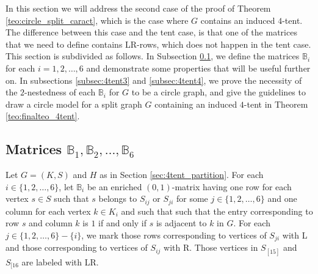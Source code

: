 \documentclass[12pt]{book}
\theoremstyle{plain}
\theoremstyle{remark}
\begin{document}
In this section we will address the second case of the proof of Theorem \ref{teo:circle_split_caract}, which is the case where $G$ contains an induced $4$-tent. The difference between this case and the tent case, is that one of the matrices that we need to define contains LR-rows, which does not happen in the tent case.
This section is subdivided as follows. %
In Subsection \ref{subsec:4tent2}, we define the matrices $\mathbb{B}_i$ for each $i=1, 2, \ldots, 6$ and demonstrate some properties that will be useful further on. 
In subsections \ref{subsec:4tent3} and \ref{subsec:4tent4}, we prove the necessity of the $2$-nestedness of each $\mathbb B_i$ for $G$ to be a circle graph, and give the guidelines to draw a circle model for a split graph $G$ containing an induced $4$-tent in Theorem \ref{teo:finalteo_4tent}.



\subsection{Matrices $\mathbb B_1,\mathbb B_2,\ldots,\mathbb B_6$} \label{subsec:4tent2}


Let $G=(K,S)$ and $H$ as in Section \ref{sec:4tent_partition}.
For each $i\in\{1,2,\ldots,6\}$, let $\mathbb B_i$ be an enriched $(0,1)$-matrix having one row for each vertex $s\in S$ such that $s$ belongs to $S_{ij}$ or $S_{ji}$ for some $j\in\{1,2,\ldots,6\}$ and one column for each vertex $k\in K_i$ and such that such that the entry corresponding to row $s$ and column $k$ is $1$ if and only if $s$ is adjacent to $k$ in $G$. For each $j\in\{1,2,\ldots,6\}-\{i\}$, we mark those rows corresponding to vertices of $S_{ji}$ with L and those corresponding to vertices of $S_{ij}$ with R. Those vertices in $S_{[15]}$ and $S_{[16}$ are labeled with LR.
\end{document}
